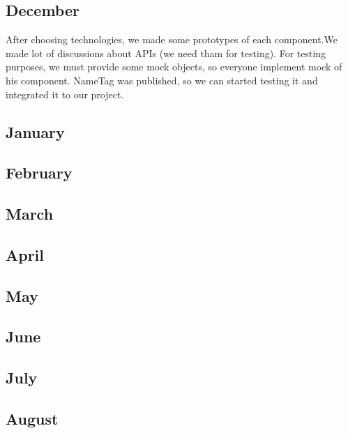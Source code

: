 \subsection{December}
After choosing technologies, we made some prototypes of each component.We made lot of discussions about APIs (we need tham for testing). For testing purposes, we must provide some mock objects, so everyone implement mock of his component.
NameTag was published, so we can started testing it and integrated it to our project.
\subsection{January}
\subsection{February}
\subsection{March}
\subsection{April}
\subsection{May}
\subsection{June}
\subsection{July}
\subsection{August}